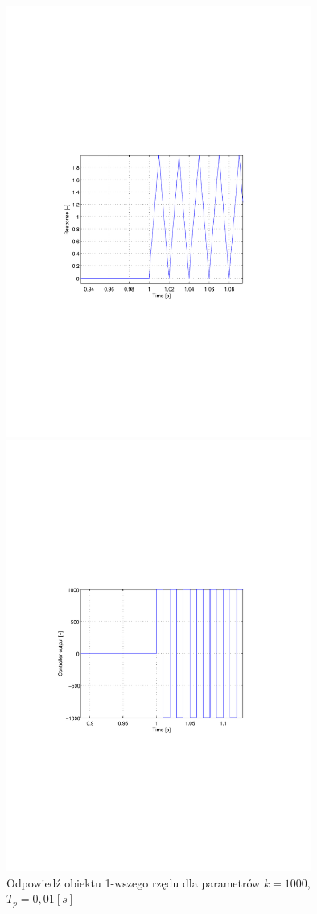 \documentclass[12pt]{article}
\begin{document}
\begin{figure}[!htb]
	\begin{center}
		\includegraphics[trim=5cm 9cm 5cm 9cm,width=10cm]{../res/img/d1_0,01_1000y.pdf} 
	\end{center}
	
	\begin{center}
		\includegraphics[trim=5cm 9cm 5cm 9cm,width=10cm]{../res/img/d1_0,01_1000u.pdf} 
	\end{center}
	\caption{Odpowiedź obiektu 1-wszego rzędu dla parametrów $k=1000$,
	$T_p=0,01[s]$}
\end{figure}
\end{document}

